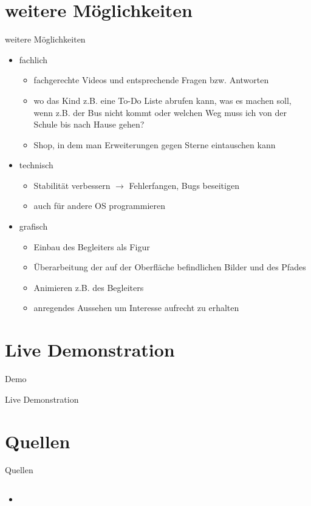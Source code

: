 \documentclass[10pt,fleqn]{beamer}
\begin{document}
\section{weitere Möglichkeiten}
\begin{frame}[t]{weitere Möglichkeiten}
\begin{itemize}
	\item fachlich
	\begin{itemize}
		\item fachgerechte Videos und entsprechende Fragen bzw. Antworten
		\item wo das Kind z.B. eine To-Do Liste abrufen kann, was es machen soll,
		wenn z.B. der Bus nicht kommt oder welchen Weg muss ich von der Schule bis nach
		Hause gehen?
		\item Shop, in dem man Erweiterungen gegen Sterne eintauschen kann
	\end{itemize}
	\item technisch
		\begin{itemize}
		\item Stabilität verbessern $\rightarrow$ Fehlerfangen, Bugs beseitigen
		\item auch für andere OS programmieren 
	\end{itemize}
	\item grafisch
	\begin{itemize}
		\item Einbau des Begleiters als Figur
		\item Überarbeitung der auf der Oberfläche befindlichen Bilder und des Pfades
		\item Animieren z.B. des Begleiters
		\item anregendes Aussehen um Interesse aufrecht zu erhalten
	\end{itemize}
	
\end{itemize}

\end{frame}

\section{Live Demonstration}
\begin{frame}[t]{Demo}
	\begin{center}
		\begin{Huge}
			Live Demonstration
		\end{Huge}
	\end{center}
\end{frame}

\section{Quellen}
\begin{frame}{Quellen}
	\begin{columns}
		\begin{column}{16cm}	
			\begin{itemize}
				\item 
			\end{itemize}
		\end{column}
	\end{columns}
\end{frame}
\end{document}
